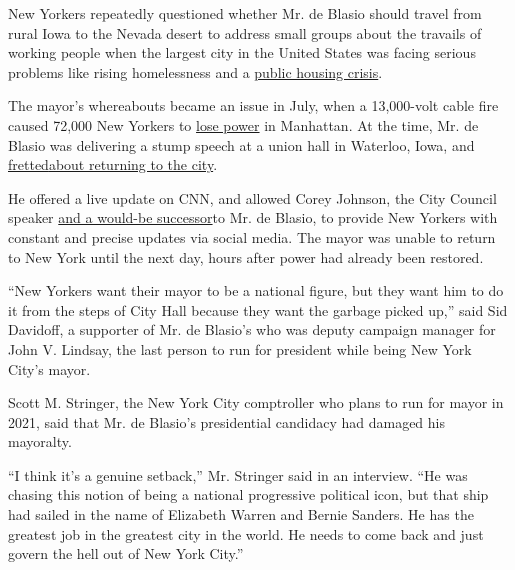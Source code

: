 New Yorkers repeatedly questioned whether Mr. de Blasio should travel
from rural Iowa to the Nevada desert to address small groups about the
travails of working people when the largest city in the United States
was facing serious problems like rising homelessness and a
\href{https://www.nytimes.com/2019/01/31/nyregion/hud-nycha-deal.html}{public
housing crisis}.

The mayor's whereabouts became an issue in July, when a 13,000-volt
cable fire caused 72,000 New Yorkers to
\href{https://www.nytimes.com/2019/07/15/nyregion/nyc-blackout-con-edison.html}{lose
power} in Manhattan. At the time, Mr. de Blasio was delivering a stump
speech at a union hall in Waterloo, Iowa, and
\href{https://www.nytimes.com/2019/07/14/nyregion/bill-de-blasio-nyc-blackout.html?rref=collection\%2Fbyline\%2Fjeffery-c.-mays\&action=click\&contentCollection=undefined\&region=stream\&module=stream_unit\&version=latest\&contentPlacement=6\&pgtype=collection}{fretted}\href{https://www.nytimes.com/2019/07/14/nyregion/bill-de-blasio-nyc-blackout.html?rref=collection\%2Fbyline\%2Fjeffery-c.-mays\&action=click\&contentCollection=undefined\&region=stream\&module=stream_unit\&version=latest\&contentPlacement=6\&pgtype=collection}{about
returning to the city}.

He offered a live update on CNN, and allowed Corey Johnson, the City
Council speaker
\href{https://www.nytimes.com/2019/06/06/nyregion/corey-johnson-bill-deblasio.html}{and
a would-be successor}to Mr. de Blasio, to provide New Yorkers with
constant and precise updates via social media. The mayor was unable to
return to New York until the next day, hours after power had already
been restored.

``New Yorkers want their mayor to be a national figure, but they want
him to do it from the steps of City Hall because they want the garbage
picked up,'' said Sid Davidoff, a supporter of Mr. de Blasio's who was
deputy campaign manager for John V. Lindsay, the last person to run for
president while being New York City's mayor.

Scott M. Stringer, the New York City comptroller who plans to run for
mayor in 2021, said that Mr. de Blasio's presidential candidacy had
damaged his mayoralty.

``I think it's a genuine setback,'' Mr. Stringer said in an interview.
``He was chasing this notion of being a national progressive political
icon, but that ship had sailed in the name of Elizabeth Warren and
Bernie Sanders. He has the greatest job in the greatest city in the
world. He needs to come back and just govern the hell out of New York
City.''


